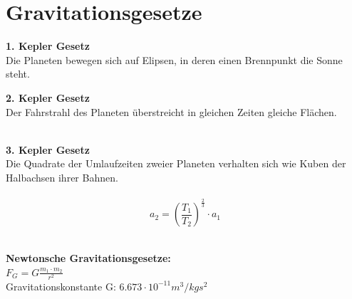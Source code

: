 \section{Gravitationsgesetze}
\begin{multicols}{3}
\textbf{1. Kepler Gesetz} \\
Die Planeten bewegen sich auf Elipsen, in deren einen Brennpunkt die Sonne steht. \\
\columnbreak

\textbf{2. Kepler Gesetz} \\
Der Fahrstrahl des Planeten überstreicht in gleichen Zeiten gleiche Flächen. \\
\\
\columnbreak

\textbf{3. Kepler Gesetz} \\
Die Quadrate der Umlaufzeiten zweier Planeten verhalten sich wie Kuben der Halbachsen ihrer Bahnen. \\
\\
$$a_2 = (\frac{T_1}{T_2})^\frac{2}{3} \cdot a_1 $$ \\
\end{multicols}

\textbf{Newtonsche Gravitationsgesetze:} \\
$ F_G = G\frac{m_1 \cdot m_2}{r^2} $ \\
Gravitationskonstante G: $6.673 \cdot 10^{-11} m^3 / kg s^2$
